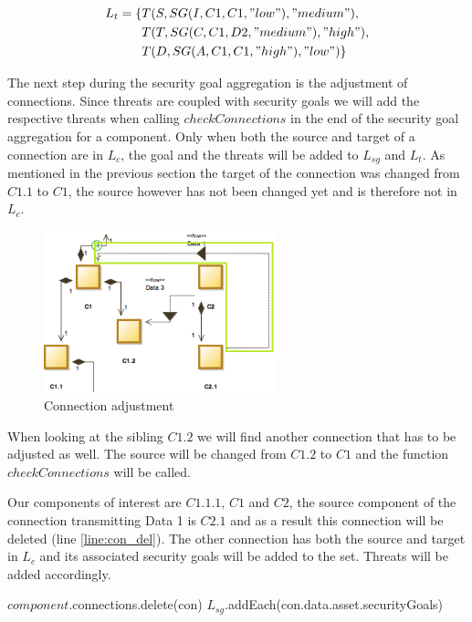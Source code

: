 \begin{align*}
L_t = \{&T(S, SG(I,C1,C1,"low"), "medium"), \\
&T(T, SG(C,C1,D2,"medium"), "high"), \\
&T(D, SG(A,C1,C1,"high"), "low")\}
\end{align*}

The next step during the security goal aggregation is the adjustment of connections. Since threats are coupled with security goals we will add the respective threats when calling $checkConnections$ in the end of the security goal aggregation for a component. Only when both the source and target of a connection are in $L_c$, the goal and the threats will be added to $L_{sg}$ and $L_t$. As mentioned in the previous section the target of the connection was changed from $C1.1$ to $C1$, the source however has not been changed yet and is therefore not in $L_c$. 

\begin{figure}[H]
\centering
\includegraphics[width=0.6\textwidth]{pictures/con_c11}
\caption{Connection adjustment}
\end{figure}

When looking at the sibling $C1.2$ we will find another connection that has to be adjusted as well. The source will be changed from $C1.2$ to $C1$ and the function $checkConnections$ will be called.

Our components of interest are $C1.1.1$, $C1$ and $C2$, the source component of the connection transmitting Data 1 is $C2.1$ and as a result this connection will be deleted (line \ref{line:con_del}). The other connection has both the source and target in $L_c$ and its associated security goals will be added to the set. Threats will be added accordingly.

\begin{algorithm}[H]
\begin{algorithmic}
\State $component$.connections.delete(con) 
\Else
\State $L_{sg}$.addEach(con.data.asset.securityGoals)
\State {}
\EndIf
\EndFor
\EndFunction
\end{algorithmic}
\end{algorithm}

